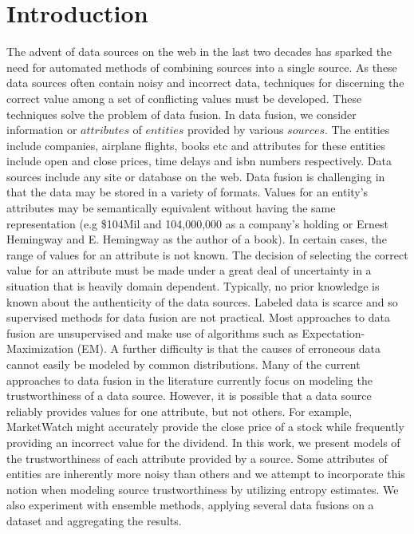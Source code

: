 \documentclass{acm_proc_article-sp}
\begin{document}
\maketitle





\section{Introduction}

The advent of data sources on the web in the last two decades has sparked the need for automated methods of combining sources into a single source. As these data sources often contain noisy and incorrect data, techniques for discerning the correct value among a set of conflicting values must be developed. These techniques solve the problem of data fusion. In data fusion, we consider information or $attributes$ of $entities$ provided by various $sources$. The entities include companies, airplane flights, books etc and attributes for these entities include open and close prices, time delays and isbn numbers respectively. Data sources include any site or database on the web. Data fusion is challenging in that the data may be stored in a variety of formats. Values for an entity's attributes may be semantically equivalent without having the same representation (e.g \$104Mil and 104,000,000 as a company's holding or Ernest Hemingway and E. Hemingway as the author of a book). In certain cases, the range of values for an attribute is not known. The decision of selecting the correct value for an attribute must be made under a great deal of uncertainty in a situation that is heavily domain dependent. Typically, no prior knowledge is known about the authenticity of the data sources. Labeled data is scarce and so supervised methods for data fusion are not practical. Most approaches to data fusion are unsupervised and make use of algorithms such as Expectation-Maximization (EM). A further difficulty is that the causes of erroneous data cannot easily be modeled by common distributions. Many of the current approaches to data fusion in the literature currently focus on modeling the trustworthiness of a data source. However, it is possible that a data source reliably provides values for one attribute, but not others. For example, MarketWatch might accurately provide the close price of a stock while frequently providing an incorrect value for the dividend. In this work, we present models of the trustworthiness of each attribute provided by a source. Some attributes of entities are inherently more noisy than others and we attempt to incorporate this notion when modeling source trustworthiness by utilizing entropy estimates. We also experiment with ensemble methods, applying several data fusions on a dataset and aggregating the results. 
\end{document}
